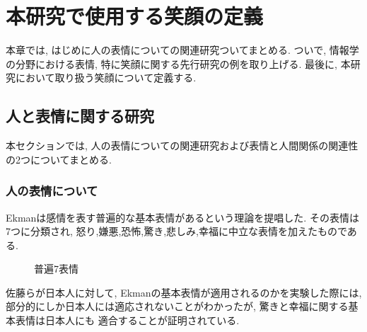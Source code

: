 \chapter{本研究で使用する笑顔の定義}
\label{chap:smile}

本章では, はじめに人の表情についての関連研究ついてまとめる.
ついで, 情報学の分野における表情, 特に笑顔に関する先行研究の例を取り上げる.
最後に, 本研究において取り扱う笑顔について定義する.

\section{人と表情に関する研究}
本セクションでは, 人の表情についての関連研究および表情と人間関係の関連性の2つについてまとめる.
\subsection{人の表情について}
Ekmanは感情を表す普遍的な基本表情があるという理論を提唱した.
その表情は7つに分類され, 怒り,嫌悪,恐怖,驚き,悲しみ,幸福に中立な表情を加えたものである.\cite{ekman}
\begin{figure}[htbp]
    \begin{center}
    \end{center}
    \caption{普遍7表情}
    \label{fig:universal_facial_expression}
\end{figure}
佐藤らが日本人に対して, Ekmanの基本表情が適用されるのかを実験した際には,
部分的にしか日本人には適応されないことがわかったが, 驚きと幸福に関する基本表情は日本人にも
適合することが証明されている.\cite{JapaneseFacialExpression}
